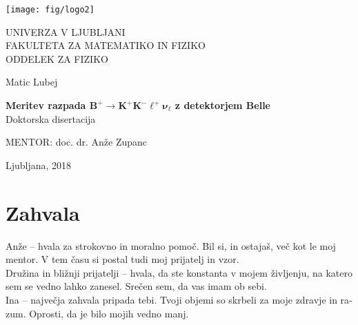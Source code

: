 
\cleardoublepage
\begin{otherlanguage}{slovene}
\begin{center}

\texttt{[image: fig/logo2]}

{\large UNIVERZA V LJUBLJANI\\
FAKULTETA ZA MATEMATIKO IN FIZIKO\\
ODDELEK ZA FIZIKO\\}

\vspace{5cm}

{\Large Matic Lubej\\}

\vspace{10mm}

{\bf \Large Meritev razpada $\bm{B^+ \to K^+K^-\ell^+\nu_\ell}$ z detektorjem Belle\\}
\vspace{5mm}
{\large Doktorska disertacija}\\

\vfill

{\large MENTOR: doc. dr. An\v ze Zupanc\\
}



\vspace{2cm}

{\large Ljubljana, 2018}

\end{center}



\cleardoublepage

\pagestyle{plain}
\vfill
\chapter*{Zahvala}

\noindent Anže -- hvala za strokovno in moralno pomoč. Bil si, in ostajaš, več kot le moj mentor. V tem času si postal tudi moj prijatelj in vzor.\\

\noindent Družina in bližnji prijatelji -- hvala, da ste konstanta v mojem življenju, na katero sem se vedno lahko zanesel. Srečen sem, da vas imam ob sebi.\\

\noindent Ina -- največja zahvala pripada tebi. Tvoji objemi so skrbeli za moje zdravje in razum. Oprosti, da je bilo mojih vedno manj.\\


\end{otherlanguage}
